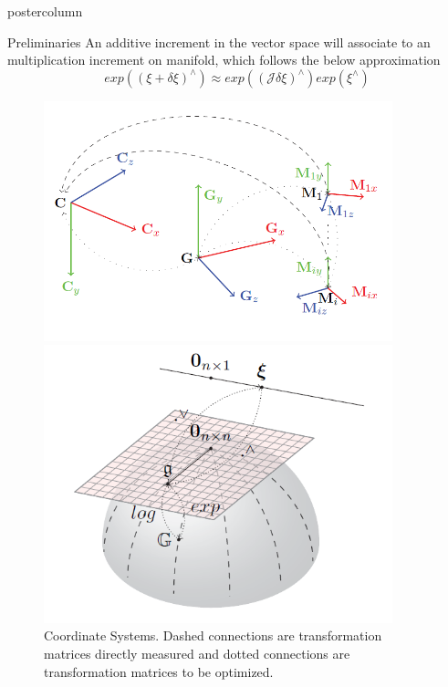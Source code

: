 \documentclass{beamer}
\begin{document}
\begin{frame}
\begin{columns}
\begin{column}{.4\textwidth}
\begin{beamercolorbox}[center]{postercolumn}
\begin{minipage}{.98\textwidth}
{\begin{myblock}{Preliminaries}
An additive increment in the vector space will associate to an multiplication increment on manifold, which follows the below approximation
\begin{equation}
\label{eq:manifoldapprox}
exp((\mathbb{\xi}+\delta \mathbb{\xi})^{\land}) \approx exp((\mathcal{J}\delta\mathbb{\xi}) ^{\land})exp(\mathbb{\xi}^{\land})
\end{equation}
\vspace{0.4em}
						\begin{figure}
							\begin{minipage}{0.43\textwidth}
								\centering						\includegraphics[width=0.9\textwidth]{img/coor.png}
                  	\caption{Coordinate Systems. Dashed connections are transformation matrices directly measured and dotted connections are transformation matrices to be optimized.}
							\end{minipage}
							\hspace{1em}
							\begin{minipage}{0.45\textwidth}
                    \includegraphics[width=0.9\textwidth]{img/lie.png}

\end{minipage}
\end{figure}
\end{myblock}}
\end{minipage}
\end{beamercolorbox}
\end{column}
\end{columns}
\end{frame}
\end{document}
